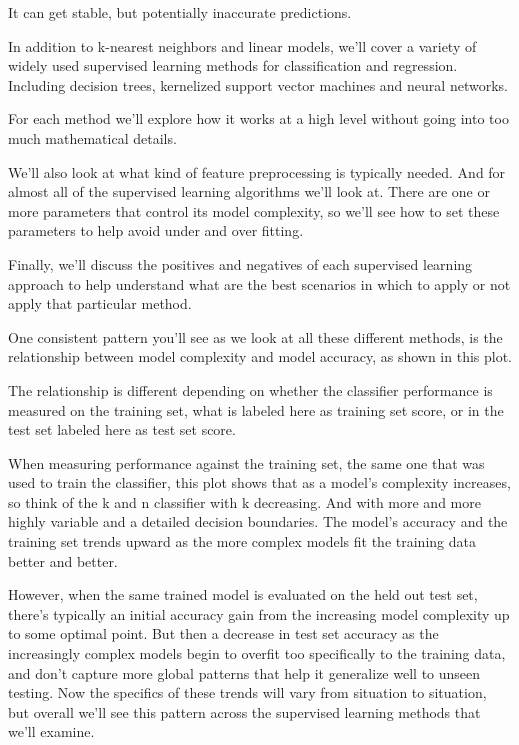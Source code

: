 \begin{multicols}{2}
It can get stable, but potentially inaccurate predictions. 

In addition to k-nearest neighbors and linear models, we'll cover a variety of widely used supervised learning methods for classification and regression. Including decision trees, kernelized support vector machines and neural networks. 

For each method we'll explore how it works at a high level without going into too much mathematical details. 

We'll also look at what kind of feature preprocessing is typically needed. And for almost all of the supervised learning algorithms we'll look at. There are one or more parameters that control its model complexity, so we'll see how to set these parameters to help avoid under and over fitting. 

Finally, we'll discuss the positives and negatives of each supervised learning approach to help understand what are the best scenarios in which to apply or not apply that particular method. 

One consistent pattern you'll see as we look at all these different methods, is the relationship between model complexity and model accuracy, as shown in this plot. 

The relationship is different depending on whether the classifier performance is measured on the training set, what is labeled here as training set score, or in the test set labeled here as test set score. 

When measuring performance against the training set, the same one that was used to train the classifier, this plot shows that as a model's complexity increases, so think of the k and n classifier with k decreasing. And with more and more highly variable and a detailed decision boundaries. The model's accuracy and the training set trends upward as the more complex models fit the training data better and better. 

However, when the same trained model is evaluated on the held out test set, there's typically an initial accuracy gain from the increasing model complexity up to some optimal point. But then a decrease in test set accuracy as the increasingly complex models begin to overfit too specifically to the training data, and don't capture more global patterns that help it generalize well to unseen testing. Now the specifics of these trends will vary from situation to situation, but overall we'll see this pattern across the supervised learning methods that we'll examine. 


\end{multicols}
